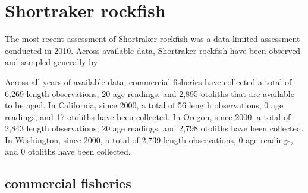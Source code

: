 \documentclass[11pt,
  english,
  letterpaper,
]{article}
\begin{document}

\hypertarget{shortraker-rockfish}{%
\section{Shortraker rockfish}\label{shortraker-rockfish}}

\leavevmode\tagmcend\tagstructend


The most recent assessment of Shortraker rockfish was a data-limited assessment conducted in 2010. Across available data, Shortraker rockfish have been observed and sampled generally by

\leavevmode\tagmcend\tagstructend\par


Across all years of available data, commercial fisheries have collected a total of 6,269 length observations, 20 age readings, and 2,895 otoliths that are available to be aged. In California, since 2000, a total of 56 length observations, 0 age readings, and 17 otoliths have been collected. In Oregon, since 2000, a total of 2,843 length observations, 20 age readings, and 2,798 otoliths have been collected. In Washington, since 2000, a total of 2,739 length observations, 0 age readings, and 0 otoliths have been collected.

\leavevmode\tagmcend\tagstructend\par


\hypertarget{commercial-fisheries-47}{%
\subsection{commercial fisheries}\label{commercial-fisheries-47}}

\leavevmode\tagmcend\tagstructend


\begingroup\fontsize{10}{12}\selectfont \begingroup\fontsize{10}{12}\selectfont

\leavevmode\tagmcend\tagstructend\par
\end{document}
